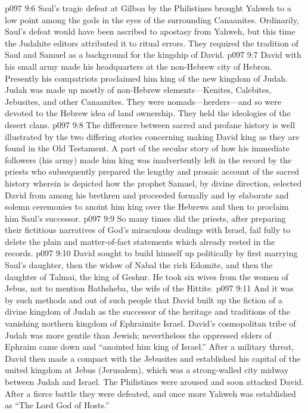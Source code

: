 \vs p097 9:6 Saul’s tragic defeat at Gilboa by the Philistines brought Yahweh to a low point among the gods in the eyes of the surrounding Canaanites. Ordinarily, Saul’s defeat would have been ascribed to apostasy from Yahweh, but this time the Judahite editors attributed it to ritual errors. They required the tradition of Saul and Samuel as a background for the kingship of David.
\vs p097 9:7 David with his small army made his headquarters at the non\hyp{}Hebrew city of Hebron. Presently his compatriots proclaimed him king of the new kingdom of Judah. Judah was made up mostly of non\hyp{}Hebrew elements---Kenites, Calebites, Jebusites, and other Canaanites. They were nomads---herders---and so were devoted to the Hebrew idea of land ownership. They held the ideologies of the desert clans.
\pc \vs p097 9:8 The difference between sacred and profane history is well illustrated by the two differing stories concerning making David king as they are found in the Old Testament. A part of the secular story of how his immediate followers (his army) made him king was inadvertently left in the record by the priests who subsequently prepared the lengthy and prosaic account of the sacred history wherein is depicted how the prophet Samuel, by divine direction, selected David from among his brethren and proceeded formally and by elaborate and solemn ceremonies to anoint him king over the Hebrews and then to proclaim him Saul’s successor.
\vs p097 9:9 So many times did the priests, after preparing their fictitious narratives of God’s miraculous dealings with Israel, fail fully to delete the plain and matter\hyp{}of\hyp{}fact statements which already rested in the records.
\pc \vs p097 9:10 David sought to build himself up politically by first marrying Saul’s daughter, then the widow of Nabal the rich Edomite, and then the daughter of Talmai, the king of Geshur. He took six wives from the women of Jebus, not to mention Bathsheba, the wife of the Hittite.
\vs p097 9:11 And it was by such methods and out of such people that David built up the fiction of a divine kingdom of Judah as the successor of the heritage and traditions of the vanishing northern kingdom of Ephraimite Israel. David’s cosmopolitan tribe of Judah was more gentile than Jewish; nevertheless the oppressed elders of Ephraim came down and “anointed him king of Israel.” After a military threat, David then made a compact with the Jebusites and established his capital of the united kingdom at Jebus (Jerusalem), which was a strong\hyp{}walled city midway between Judah and Israel. The Philistines were aroused and soon attacked David. After a fierce battle they were defeated, and once more Yahweh was established as “The Lord God of Hosts.”
